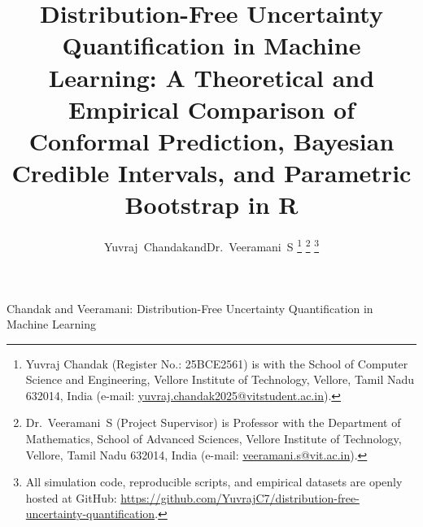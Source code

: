 \documentclass[journal]{IEEEtran}
\begin{document}
\title{Distribution-Free Uncertainty Quantification in Machine Learning: A Theoretical and Empirical Comparison of Conformal Prediction, Bayesian Credible Intervals, and Parametric Bootstrap in R}

\author{Yuvraj~Chandak\quad and\quad Dr.~Veeramani~S%
\thanks{Yuvraj Chandak (Register No.: 25BCE2561) is with the School of Computer Science and Engineering, Vellore Institute of Technology, Vellore, Tamil Nadu 632014, India (e-mail: \href{mailto:yuvraj.chandak2025@vitstudent.ac.in}{yuvraj.chandak2025@vitstudent.ac.in}).}%
\thanks{Dr.~Veeramani~S (Project Supervisor) is Professor with the Department of Mathematics, School of Advanced Sciences, Vellore Institute of Technology, Vellore, Tamil Nadu 632014, India (e-mail: \href{mailto:veeramani.s@vit.ac.in}{veeramani.s@vit.ac.in}).}%
\thanks{All simulation code, reproducible scripts, and empirical datasets are openly hosted at GitHub: \url{https://github.com/YuvrajC7/distribution-free-uncertainty-quantification}.}}

%
{Chandak and Veeramani: Distribution-Free Uncertainty Quantification in Machine Learning}

\maketitle
\end{document}
